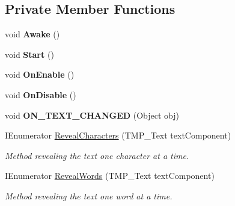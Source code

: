 \subsection*{Private Member Functions}
\begin{DoxyCompactItemize}
\item 
\mbox{\label{class_t_m_pro_1_1_examples_1_1_text_console_simulator_abbc6d2f5a25c301388f03bda7382bf07}} 
void {\bfseries Awake} ()
\item 
\mbox{\label{class_t_m_pro_1_1_examples_1_1_text_console_simulator_a83594792d8d11ed3a2d4b758ca7ee217}} 
void {\bfseries Start} ()
\item 
\mbox{\label{class_t_m_pro_1_1_examples_1_1_text_console_simulator_ad9bb1142c943693a7bbe56e04b48964d}} 
void {\bfseries On\+Enable} ()
\item 
\mbox{\label{class_t_m_pro_1_1_examples_1_1_text_console_simulator_a94ced624d0ea2be830df1cd237b3a152}} 
void {\bfseries On\+Disable} ()
\item 
\mbox{\label{class_t_m_pro_1_1_examples_1_1_text_console_simulator_a006cf2646d07f88b304fe360f2c24ac1}} 
void {\bfseries O\+N\+\_\+\+T\+E\+X\+T\+\_\+\+C\+H\+A\+N\+G\+ED} (Object obj)
\item 
I\+Enumerator \hyperlink{class_t_m_pro_1_1_examples_1_1_text_console_simulator_abb2ccedacf0ba2dfe698d60507e4dfec}{Reveal\+Characters} (T\+M\+P\+\_\+\+Text text\+Component)
\begin{DoxyCompactList}\small\item\em Method revealing the text one character at a time. \end{DoxyCompactList}\item 
I\+Enumerator \hyperlink{class_t_m_pro_1_1_examples_1_1_text_console_simulator_a3becab8f9f7e9f902a73247c2bcc9ec9}{Reveal\+Words} (T\+M\+P\+\_\+\+Text text\+Component)
\begin{DoxyCompactList}\small\item\em Method revealing the text one word at a time. \end{DoxyCompactList}\end{DoxyCompactItemize}
